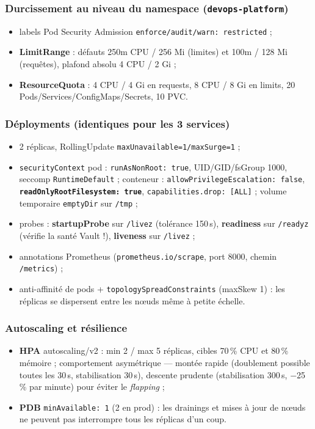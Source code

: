 \documentclass[11pt,a4paper]{article}
\begin{document}
\subsubsection{Durcissement au niveau du namespace (\texttt{devops-platform})}
\begin{itemize}[itemsep=1pt]
  \item labels Pod Security Admission \texttt{enforce/audit/warn: restricted} ;
  \item \textbf{LimitRange} : défauts 250m CPU / 256 Mi (limites) et 100m / 128 Mi (requêtes), plafond absolu 4 CPU / 2 Gi ;
  \item \textbf{ResourceQuota} : 4 CPU / 4 Gi en requests, 8 CPU / 8 Gi en limits, 20 Pods/Services/ConfigMaps/Secrets, 10 PVC.
\end{itemize}

\subsubsection{Déployments (identiques pour les 3 services)}
\begin{itemize}[itemsep=1pt]
  \item 2 réplicas, RollingUpdate \texttt{maxUnavailable=1/maxSurge=1} ;
  \item \texttt{securityContext} pod : \texttt{runAsNonRoot: true}, UID/GID/fsGroup 1000, seccomp \texttt{RuntimeDefault} ; conteneur : \texttt{allowPrivilegeEscalation: false}, \textbf{\texttt{readOnlyRootFilesystem: true}}, \texttt{capabilities.drop: [ALL]} ; volume temporaire \texttt{emptyDir} sur \texttt{/tmp} ;
  \item probes : \textbf{startupProbe} sur \texttt{/livez} (tolérance 150\,s), \textbf{readiness} sur \texttt{/readyz} (vérifie la santé Vault !), \textbf{liveness} sur \texttt{/livez} ;
  \item annotations Prometheus (\texttt{prometheus.io/scrape}, port 8000, chemin \texttt{/metrics}) ;
  \item anti-affinité de pods + \texttt{topologySpreadConstraints} (maxSkew 1) : les réplicas se dispersent entre les nœuds même à petite échelle.
\end{itemize}

\subsubsection{Autoscaling et résilience}
\begin{itemize}[itemsep=1pt]
  \item \textbf{HPA} autoscaling/v2 : min 2 / max 5 réplicas, cibles 70\,\% CPU et 80\,\% mémoire ; comportement asymétrique --- montée rapide (doublement possible toutes les 30\,s, stabilisation 30\,s), descente prudente (stabilisation 300\,s, $-$25\,\% par minute) pour éviter le \emph{flapping} ;
  \item \textbf{PDB} \texttt{minAvailable: 1} (2 en prod) : les drainings et mises à jour de nœuds ne peuvent pas interrompre tous les réplicas d'un coup.
\end{itemize}
\end{document}
